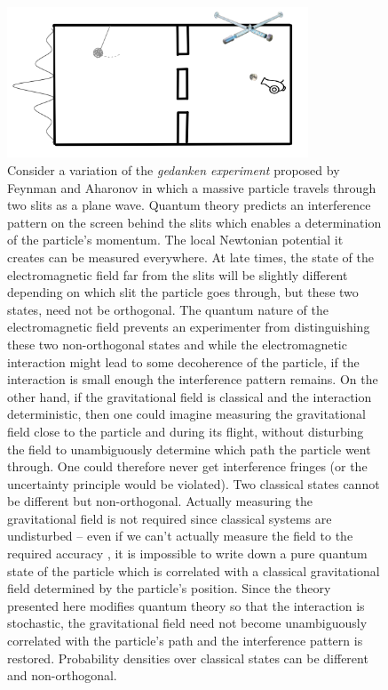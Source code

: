 \documentclass[aps,pra,showpacs,citeautoscript,amsmath,amssymb,floatfix,superscriptaddress,bbm, verbatim,amsfonts,changes,11pt,nofootinbib,longbibliography]{revtex4-2}
\begin{document}
\begin{figure}[h]
\includegraphics[width=0.8\textwidth]{doubleslit.png}
\caption{Consider a variation of the {\it gedanken experiment} proposed by Feynman \cite{cecile2011role,Feynman:1996kb-note} and Aharonov \cite{AharonovParadoxes-note} in which a massive particle travels through two slits as a plane wave. Quantum theory predicts an interference pattern on the screen behind the slits which enables a determination of the particle's momentum. 
The local Newtonian potential it creates can be measured everywhere. %
	At late times, the state of the electromagnetic field far from the slits will be slightly different depending on which slit the particle goes through, but these two states, need not be orthogonal. The quantum nature of the electromagnetic field prevents an experimenter from distinguishing these two non-orthogonal states and while the electromagnetic interaction might lead to some decoherence of the particle, if the interaction is small enough the interference pattern remains. On the other hand, if the gravitational field is classical and the interaction deterministic, then one could imagine measuring the gravitational field close to the particle and during its flight, without disturbing the field to unambiguously determine which path the particle went through. One could therefore never get interference fringes (or the uncertainty principle would be violated). Two classical states cannot be different but non-orthogonal. Actually measuring the gravitational field is not required since classical systems are undisturbed -- even if we can't actually measure the field to the required accuracy \cite{mattingly2006eppley}, it is impossible to write down a pure quantum state of the particle which is correlated with a classical gravitational field determined by the particle's position. Since the theory presented here modifies quantum theory so that the interaction is stochastic, the gravitational field need not become unambiguously correlated with the particle's path and the interference pattern is restored. Probability densities over classical states can be different and non-orthogonal.}
\label{fig:doubleslit}
\end{figure}
\end{document}
